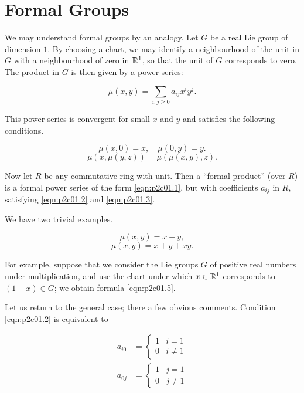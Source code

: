 \documentclass[../main]{subfiles}
\begin{document}
\chapter{Formal Groups}
\label{sec:p2c1}
We may understand formal groups by an analogy. Let $G$ be a real Lie group of dimension $1$. By choosing a chart, we may identify a neighbourhood of the unit in $G$ with a neighbourhood of zero in ${\mathbb{R}}^1$, so that the unit of $G$ corresponds to zero. The product in $G$ is then given by a power-series:

\begin{equation}
\tag{1.1}
\label{eqn:p2c01.1}
\mu(x, y) = \sum_{i, j \ge 0} a_{ij} x^i y^j.
\end{equation}

This power-series is convergent for small $x$ and $y$ and satisfies the following conditions.

\begin{equation}
\tag{1.2}
\label{eqn:p2c01.2}
\mu(x,0) = x, \quad \mu(0, y) = y.
\end{equation}
\begin{equation}
\tag{1.3}
\label{eqn:p2c01.3}
\mu(x, \mu(y, z)) = \mu(\mu(x, y), z).
\end{equation}

Now let $R$ be any commutative ring with unit. Then a ``formal product'' (over $R$) is a formal power series of the form \eqref{eqn:p2c01.1}, but with coefficients $a_{ij}$ in $R$, satisfying \eqref{eqn:p2c01.2} and \eqref{eqn:p2c01.3}. 

We have two trivial examples.

\begin{equation}
\tag{1.4} 
\label{eqn:p2c01.4}
\mu(x, y) = x + y,
\end{equation}
\begin{equation}
\tag{1.5}
\label{eqn:p2c01.5}
\mu(x, y) = x + y + xy.
\end{equation}

For example, suppose that we consider the Lie groups $G$ of positive real numbers under multiplication, and use the chart under which $x \in {\mathbb{R}}^1$ corresponds to $(1 + x) \in G$; we obtain formula \eqref{eqn:p2c01.5}.

Let us return to the general case; there a few obvious comments. Condition \eqref{eqn:p2c01.2} is equivalent to 

\begin{equation}
\tag{1.6}
\begin{split}
a_{i0} & = \begin{cases}1 & i = 1 \\ 0 & i \ne 1\end{cases} \\
a_{0j} & = \begin{cases}1 & j = 1 \\ 0 & j \ne 1\end{cases}
\end{split}
\end{equation}
\end{document}

